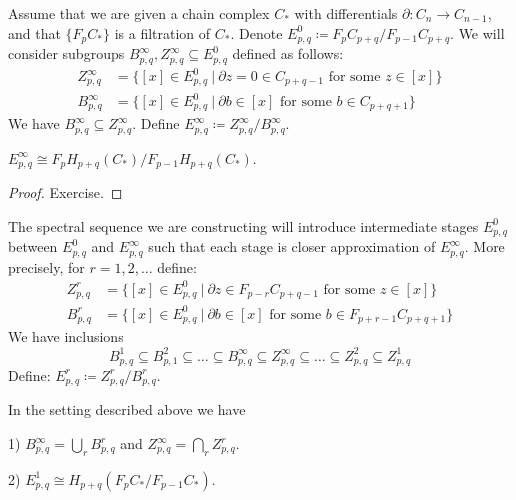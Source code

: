 Assume that we are given 
a chain complex $C_{\ast}$ with differentials $\partial \colon C_{n} \to C_{n-1}$, 
and that $\{F_{p}C_{\ast}\}$ is a filtration of $C_{\ast}$. 
Denote $E^{0}_{p, q} \coloneq F_{p}C_{p+q}/F_{p-1}C_{p+q}$. We will consider 
subgroups $B^{\infty}_{p, q}, Z^{\infty}_{p, q} \subseteq E^{0}_{p, q}$ defined 
as follows:
\begin{align*}
Z^{\infty}_{p, q} & = \{[x]\in E^{0}_{p, q} \ 
| \ \partial z = 0 \in C_{p+q-1} \text{ for some } z\in [x]\} \\
B^{\infty}_{p, q} & = \{[x]\in E^{0}_{p, q} \ 
| \ \partial b \in [x] \text{ for some } b\in C_{p+q+1} \}
\end{align*}
We have $B^{\infty}_{p, q}  \subseteq Z^{\infty}_{p, q}$. Define 
$E^{\infty}_{p, q} \coloneq Z^{\infty}_{p, q}/B^{\infty}_{p, q}$.



\begin{proposition}
$E^{\infty}_{p, q} \cong F_{p}H_{p+q}(C_{\ast})/F_{p-1}H_{p+q}(C_{\ast})$.
\end{proposition}

\begin{proof}
Exercise.
\end{proof}

The spectral sequence we are constructing will introduce intermediate stages 
$E^{0}_{p, q}$ between $E^{0}_{p, q}$ and $E^{\infty}_{p, q}$ such that each stage 
is closer approximation 
of $E^{\infty}_{p, q}$. More precisely, for $r=1, 2, \dots$ define:
\begin{align*}
Z^{r}_{p, q} & = \{[x]\in E^{0}_{p, q} \ 
| \ \partial z \in  F_{p-r}C_{p+q-1} \text{ for some } z\in [x]\} \\
B^{r}_{p, q} & = \{[x]\in E^{0}_{p, q} \ 
| \ \partial b \in [x] \text{ for some } b\in F_{p+r-1}C_{p+q+1} \}
\end{align*}
We have inclusions
\[
B^{1}_{p, q} \subseteq B^{2}_{p, 1} \subseteq {\dots} \subseteq B^{\infty}_{p, q}
\subseteq Z^{\infty}_{p, q}\subseteq {\dots} \subseteq Z^{2}_{p, q} \subseteq Z^{1}_{p, q}
\]
Define: $E^{r}_{p, q} \coloneq Z^{r}_{p, q}/B^{r}_{p, q}$. 

\begin{proposition} 
\label{E1 FILTRATION SS PROP}
In the setting described above we have
\benu
\item[1)] $B^{\infty}_{p, q} = \bigcup_{r} B^{r}_{p, q}$ and $
Z^{\infty}_{p, q} = \bigcap_{r} Z^{r}_{p, q}$.
\item[2)] $E^{1}_{p, q} \cong H_{p+q}(F_{p}C_{\ast}/F_{p-1}C_{\ast})$.
\eenu
\end{proposition}

